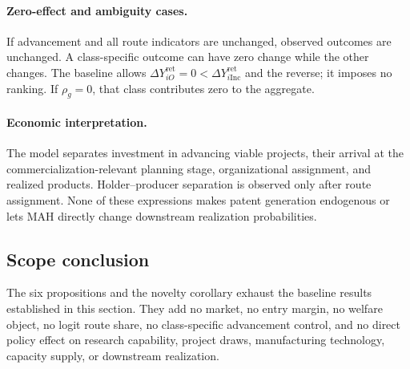 \paragraph{Zero-effect and ambiguity cases.}
If advancement and all route indicators are unchanged, observed outcomes are
unchanged. A class-specific outcome can have zero change while the other
changes. The baseline allows
\(\Delta Y_{iO}^{\mathrm{ret}}=0<
\Delta Y_{i\mathrm{Inc}}^{\mathrm{ret}}\) and the reverse; it imposes no
ranking. If \(\rho_g=0\), that class contributes zero to the aggregate.

\paragraph{Economic interpretation.}
The model separates investment in advancing viable projects, their arrival at
the commercialization-relevant planning stage, organizational assignment, and
realized products. Holder--producer separation is observed only after route
assignment. None of these expressions makes patent generation endogenous or
lets MAH directly change downstream realization probabilities.

\subsection{Scope conclusion}
\label{subsec:p08-scope}

The six propositions and the novelty corollary exhaust the baseline results
established in this section. They add no market, no entry margin, no welfare object, no
logit route share, no class-specific advancement control, and no direct policy
effect on research capability, project draws, manufacturing technology,
capacity supply, or downstream realization.
